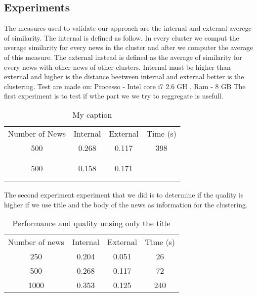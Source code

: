 \documentclass{acm_proc_article-sp}
\begin{document}
\subsection{Experiments}
The measures used to validate our approach are the internal and external averege of similarity. The internal is defined as follow. In every cluster we comput the average similarity for every news in the cluster and after we computer the average of this measure. The external instead is defined as the average of similarity for every news with other news of other clusters. Internal must be higher than external and  higher is the distance beetween internal and external better is the clustering.
Test are made on: Processo - Intel core i7 2.6 GH , Ram - 8 GB
The first experiment is to test if wthe part we we try to reggregate is usefull.
\begin{table}[h]
\centering
\label{my-label}
\begin{tabular}{cccc}
Number of News & Internal & External & Time (s) \\
500            & 0.268    & 0.117    & 398      \\
               &          &          &          \\
               &          &          &          \\
500            & 0.158    & 0.171    &          \\
               &          &          &          \\
               &          &          &         
\end{tabular}
\caption{My caption}
\end{table}

The second experiment experiment that we did is to determine if the quality is higher if we use title and the body of the news as information for the clustering.

\begin{table}[!ht]
\centering
\label{table:title}
\begin{tabular}{cccc}
Number of news & Internal & External & Time (s) \\
250            & 0.204    & 0.051    & 26       \\
500            & 0.268    & 0.117    & 72       \\
1000           & 0.353    & 0.125    & 240      \\
\end{tabular}
\caption{Performance and quality unsing only the title}
\end{table}
\end{document}
